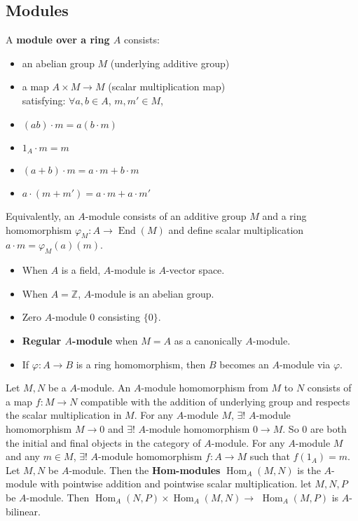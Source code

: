 \documentclass[12pt]{article}
\theoremstyle{definition}
\theoremstyle{plain}
\DeclareMathOperator{\Hom}{Hom}
\DeclareMathOperator{\End}{End}
\newcommand{\z}{\mathbb{Z}}
\begin{document}
\subsection{Modules}
\Def A \textbf{module over a ring $A$} consists:
\begin{itemize}
  \item an abelian group $M$ (underlying additive group)
  \item a map $A\times M\to M$ (scalar multiplication map) \\ \medskip satisfying: $\forall a, b\in A$, $m, m'\in M$,
  \item $(ab)\cdot m=a(b\cdot m)$
  \item $1_A\cdot m=m$
  \item $(a+b)\cdot m=a\cdot m+b\cdot m$
  \item $a\cdot (m+m')=a\cdot m+a\cdot m'$
\end{itemize}
\Rmk Equivalently, an $A$-module consists of an additive group $M$ and a ring homomorphism $\varphi_M:A\to \End(M)$ and define scalar multiplication $a\cdot m=\varphi_M(a)(m)$.
\Exe \leavevmode
\begin{itemize}
  \item When $A$ is a field, $A$-module is $A$-vector space.
  \item When $A=\z$, $A$-module is an abelian group.
  \item Zero $A$-module $0$ consisting $\{0\}$.
  \item \textbf{Regular $A$-module} when $M=A$ as a canonically $A$-module.
  \item If $\varphi:A\to B$ is a ring homomorphism, then $B$ becomes an $A$-module via $\varphi$.
\end{itemize}
\Def Let $M, N$ be a $A$-module. An $A$-module homomorphism from $M$ to $N$ consists of a map $f:M\to N$ compatible with the addition of underlying group and respects the scalar multiplication in $M$.
 For any $A$-module $M$, $\exists !$ $A$-module homomorphism $M\to 0$  and $\exists ! $ $A$-module homomorphism $0\to M$.
\Rmk So $0$ are both the initial and final objects in the category of $A$-module.
 For any $A$-module $M$ and any $m\in M$, $\exists !$ $A$-module homomorphism $f:A\to M$ such that $f(1_A)=m$.
\Def Let $M, N$ be $A$-module. Then the \textbf{Hom-modules} $\Hom_A(M, N)$ is the $A$-module with pointwise addition and pointwise scalar multiplication.
\Rmk let $M, N, P$ be $A$-module. Then $\Hom_A(N, P)\times \Hom_A(M, N)\to$ $\Hom_A(M, P)$ is $A$-bilinear.
\end{document}
